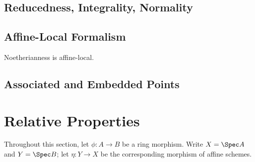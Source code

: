 \documentclass[10pt,final,oneside]{amsbook}
\makeatletter
\renewenvironment{proof}[1][\proofname] 
{ 	
	\par\pushQED{\qed}\normalfont\topsep6\p@\@plus6\p@\relax\trivlist\itemindent\normalparindent
	\item[\hskip\labelsep\itshape#1\@addpunct{.}]\ignorespaces
}
{
	\popQED\endtrivlist\@endpefalse
}
\numberwithin{equation}{section}
\makeatother
\begin{document}
\subsection{Reducedness, Integrality, Normality}



\subsection{Affine-Local Formalism}

\begin{prop}
Noetherianness is affine-local.
\end{prop}

\begin{proof}

\end{proof}


\subsection{Associated and Embedded Points}



\newpage

\section{Relative Properties}

Throughout this section, let $\phi : A \to B$ be a ring morphism.
Write $X = \Spec A$ and $Y = \Spec B$; let $\eta : Y \to X$ be the corresponding morphism of affine schemes.

\begin{comment}
\begin{prop}
Let $u : A \to B$ be a ring morphism, and let $\phi : \Spec B \to \Spec A$ be the corresponding affine-scheme morphism.
\begin{enumerate}
\item 	The following are equivalent:
			\begin{enumerate}
			\item 	$u$ is injective.
			\item 	$u_f$ is injective for all $f \in A$.
			\item 	$\smash{\phi^\#}$ is injective.
			\end{enumerate}
\item 	The following are equivalent:
			\begin{enumerate}
			\item 	$u$ is surjective.
			\item 	$u_f$ is surjective for all $f \in A$.
			\item 	$\smash{\phi^\#}$ is surjective as a sheaf and maps $\Spec B$ homeomorphically onto a closed subset of $\Spec A$.
			\end{enumerate}
\end{enumerate}
\end{prop}
\end{comment}
\end{document}
